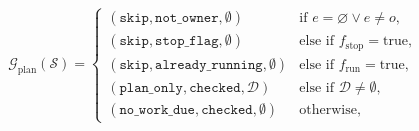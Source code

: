 \begin{equation}
\mathcal{G}_{\text{plan}}(\mathcal{S}) =
\begin{cases}
(\texttt{skip}, \texttt{not\_owner}, \emptyset) & \text{if } e = \varnothing \lor e \neq o, \\
(\texttt{skip}, \texttt{stop\_flag}, \emptyset) & \text{else if } f_{\text{stop}} = \text{true}, \\
(\texttt{skip}, \texttt{already\_running}, \emptyset) & \text{else if } f_{\text{run}} = \text{true}, \\
(\texttt{plan\_only}, \texttt{checked}, \mathcal{D}) & \text{else if } \mathcal{D} \neq \emptyset, \\
(\texttt{no\_work\_due}, \texttt{checked}, \emptyset) & \text{otherwise},
\end{cases}
\label{eq:planrun}
\end{equation}
